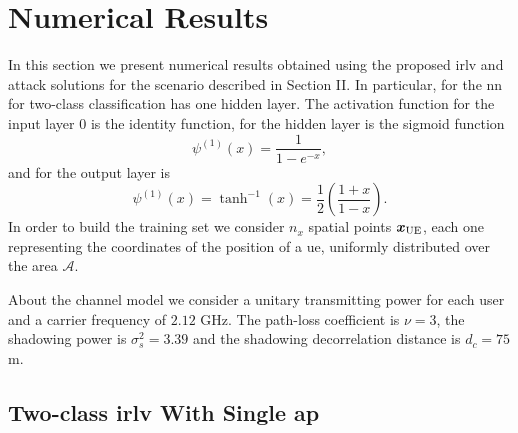 \documentclass[draftcls,onecolumn,12pt]{IEEEtran}
\begin{document}

 

    


\section{Numerical Results}


In this section we present numerical results obtained using the proposed \ac{irlv} and attack solutions for the scenario described in Section II. In particular, for the \ac{nn} for two-class classification has one hidden layer. The activation function for the input layer 0 is the identity function, for the hidden layer is the sigmoid function
\begin{equation}
\psi^{(1)}(x) = \frac{1}{1-e^{-x}},
\end{equation}
and for the output layer is 
\begin{equation}
\psi^{(1)}(x)=\tanh^{-1}(x) = \frac{1}{2} \left( \frac{1+x}{1-x} \right).
\end{equation}
In order to build the training set we consider $n_x$ spatial points $\bm{x}_{\rm UE}$, each one representing the coordinates of the position of a \ac{ue}, uniformly distributed over the area $\mathcal A$.

About the channel model we consider  a unitary transmitting power for each user and a carrier frequency of $2.12$ GHz. The path-loss coefficient is $\nu=3$, the shadowing power is $\sigma_s^2=3.39$ and the shadowing decorrelation distance is $d_c=75$ m. 


\subsection{Two-class \ac{irlv} With Single \ac{ap}}
\end{document}
